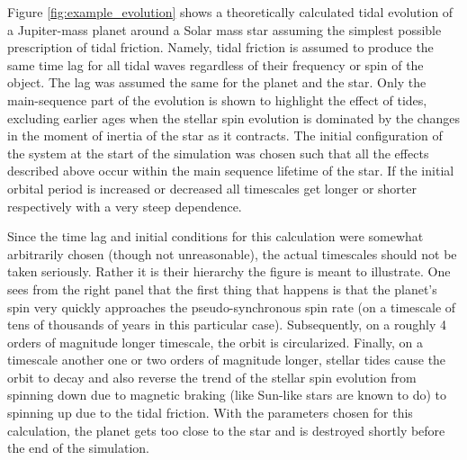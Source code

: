 Figure \ref{fig:example_evolution} shows a theoretically calculated tidal
evolution of a Jupiter-mass planet around a Solar mass star assuming the
simplest possible prescription of tidal friction. Namely, tidal friction is
assumed to produce the same time lag for all tidal waves regardless of their
frequency or spin of the object. The lag was assumed the same for the planet and
the star. Only the main-sequence part of the evolution is shown to highlight the
effect of tides, excluding  earlier ages when the stellar spin evolution is
dominated by the changes in the moment of inertia of the star as it contracts.
The initial configuration of the system at the start of the simulation was
chosen such that all the effects described above occur within the main sequence
lifetime of the star. If the initial orbital period is increased or decreased
all timescales get longer or shorter respectively with a very steep dependence.

Since the time lag and initial conditions for this calculation were somewhat
arbitrarily chosen (though not unreasonable), the actual timescales should not
be taken seriously. Rather it is their hierarchy the figure is meant to
illustrate. One sees from the right panel that the first thing that happens is
that the planet's spin very quickly approaches the pseudo-synchronous spin rate
(on a timescale of tens of thousands of years in this particular case).
Subsequently, on a roughly 4 orders of magnitude longer timescale, the orbit is
circularized. Finally, on a timescale another one or two orders of magnitude
longer, stellar tides cause the orbit to decay and also reverse the trend of the
stellar spin evolution from spinning down due to magnetic braking (like Sun-like
stars are known to do) to spinning up due to the tidal friction. With the
parameters chosen for this calculation, the planet gets too close to the star
and is destroyed shortly before the end of the simulation.

